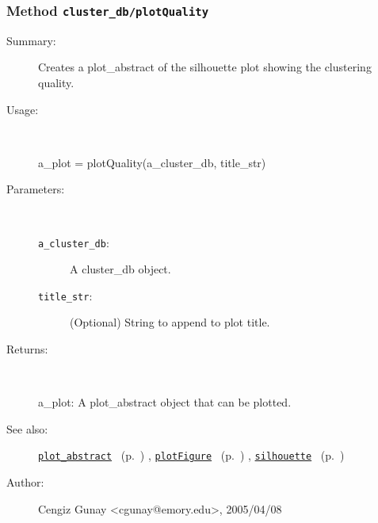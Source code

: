 \subsubsection[Method \texttt{plotQuality}]{Method \texttt{cluster\_db/plotQuality}}%
%
\label{ref_cluster_db__plotQuality}%
\hypertarget{ref_cluster_db__plotQuality}{}%
\begin{description}
\item[Summary:]Creates a plot\_abstract of the silhouette plot showing the clustering quality.
%
\item[Usage:]~%
\begin{lyxcode}%
a\_plot = plotQuality(a\_cluster\_db, title\_str)
%
\end{lyxcode}%
%
%
\item[Parameters:]~
\begin{description}%
\item[\texttt{a\_cluster\_db}:]
 A cluster\_db object.
\item[\texttt{title\_str}:]
 (Optional) String to append to plot title.
\end{description}%
%
\item[Returns:]~

	a\_plot: A plot\_abstract object that can be plotted.
%
%
\item[See also:]%
\hyperlink{ref_plot_abstract}{\texttt{plot\_abstract}}%
\ (p.~\pageref{ref_plot_abstract})%
%
, \hyperlink{ref_plotFigure}{\texttt{plotFigure}}%
\ (p.~\pageref{ref_plotFigure})%
%
, \hyperlink{ref_silhouette}{\texttt{silhouette}}%
\ (p.~\pageref{ref_silhouette})%
%
%
\item[Author:]%
Cengiz Gunay <cgunay@emory.edu>, 2005/04/08%
\end{description}
\methodline%
